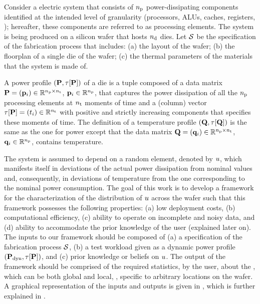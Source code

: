 Consider a electric system that consists of ${n_\text{p}}$ power-dissipating components identified at the intended level of granularity (processors, ALUs, caches, registers, \etc); hereafter, these components are referred to as processing elements.
The system is being produced on a silicon wafer that hosts ${n_\text{d}}$ dies.
Let $\mathcal{S}$ be the specification of the fabrication process that includes: (a) the layout of the wafer; (b) the floorplan of a single die of the wafer; (c) the thermal parameters of the materials that the system is made of.

A power profile $\profileP$ of a die is a tuple composed of a data matrix $\mathbf{P} = (\mathbf{p}_i) \in \mathbb{R}^{{n_\text{p}} \times {n_\text{t}}}$, $\mathbf{p}_i \in \mathbb{R}^{n_\text{p}}$, that captures the power dissipation of all the ${n_\text{p}}$ processing elements at ${n_\text{t}}$ moments of time and a (column) vector $\tau[\mathbf{P}] = (t_i) \in \mathbb{R}^{{n_\text{t}}}$ with positive and strictly increasing components that specifies these moments of time.
The definition of a temperature profile $\profileT$ is the same as the one for power except that the data matrix $\mathbf{Q} = (\mathbf{q}_i) \in \mathbb{R}^{{n_\text{p}} \times {n_\text{t}}}$, $\mathbf{q}_i \in \mathbb{R}^{n_\text{p}}$, contains temperature.

The system is assumed to depend on a random element, denoted by $u$, which manifests itself in deviations of the actual power dissipation from nominal values and, consequently, in deviations of temperature from the one corresponding to the nominal power consumption.
The goal of this work is to develop a framework for the characterization of the distribution of $u$ across the wafer such that this framework possesses the following properties: (a) low deployment costs, (b) computational efficiency, (c) ability to operate on incomplete and noisy data, and (d) ability to accommodate the prior knowledge of the user (explained later on).
The inputs to our framework should be composed of (a) a specification of the fabrication process $\mathcal{S}$, (b) a test workload given as a dynamic power profile $(\mathbf{P}_{\text{dyn}}, \tau[\mathbf{P}])$, and (c) prior knowledge or beliefs on $u$.
The output of the framework should be comprised of the required statistics, by the user, about the \qoi, which can be both global and local, \ie, specific to arbitrary locations on the wafer.
A graphical representation of the inputs and outputs is given in , which is further explained in .

